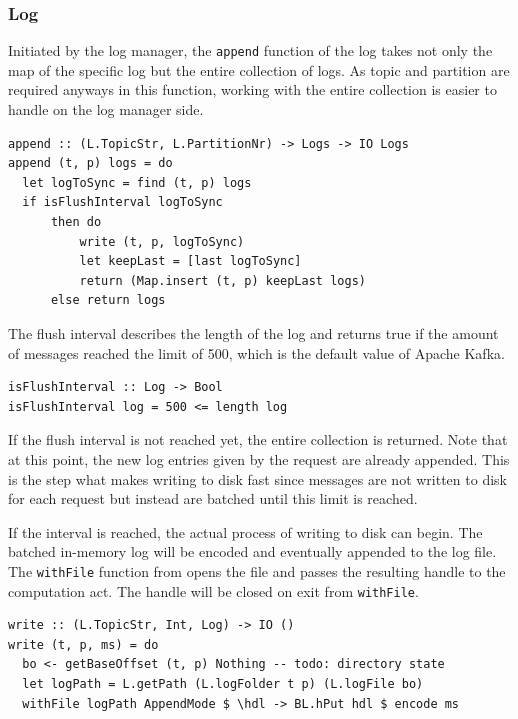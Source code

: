 \subsubsection{Log}

Initiated by the log manager, the \lstinline{append} function of the log takes
not only the map of the specific log but the entire collection of logs. As topic
and partition are required anyways in this function, working with the entire
collection is easier to handle on the log manager side.

\begin{lstlisting}[caption={Append messages to log}]
append :: (L.TopicStr, L.PartitionNr) -> Logs -> IO Logs
append (t, p) logs = do
  let logToSync = find (t, p) logs
  if isFlushInterval logToSync
      then do
          write (t, p, logToSync)
          let keepLast = [last logToSync]
          return (Map.insert (t, p) keepLast logs)
      else return logs
\end{lstlisting}

The flush interval describes the length of the log and returns true if the
amount of messages reached the limit of 500, which is the default value of
Apache Kafka.

\begin{lstlisting}[caption={Check if enough messages are given for flush to disk}]
isFlushInterval :: Log -> Bool
isFlushInterval log = 500 <= length log
\end{lstlisting}

If the flush interval is not reached yet, the entire collection is returned.
Note that at this point, the new log entries given by the request are already
appended. This is the step what makes writing to disk fast since messages are
not written to disk for each request but instead are batched until this limit is
reached.

If the interval is reached, the actual process of writing to disk can begin.
The batched in-memory log will be encoded and eventually appended to the log
file. The \lstinline{withFile} function from  opens
the file and passes the resulting handle to the computation act.  The handle
will be closed on exit from \lstinline{withFile}.

\begin{lstlisting}[caption={Write message to file in AppendMode}]
write :: (L.TopicStr, Int, Log) -> IO ()
write (t, p, ms) = do
  bo <- getBaseOffset (t, p) Nothing -- todo: directory state
  let logPath = L.getPath (L.logFolder t p) (L.logFile bo)
  withFile logPath AppendMode $ \hdl -> BL.hPut hdl $ encode ms
\end{lstlisting}


